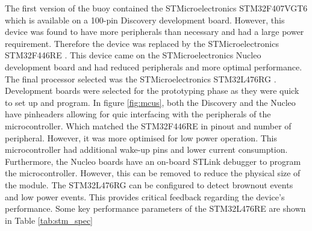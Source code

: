 The first version of the buoy contained the STMicroelectronics STM32F407VGT6 \cite{stmdisc} which is available on a 100-pin Discovery development board. However, this device was found to have more peripherals than necessary and had a large power requirement. Therefore the device was replaced by the STMicroelectronics STM32F446RE \cite{stmnucleo}. This device came on the STMicroelectronics Nucleo development board and had reduced peripherals and more optimal performance. The final processor selected was the STMicroelectronics STM32L476RG \cite{stm32l4}. Development boards were selected for the prototyping phase as they were quick to set up and program. In figure \ref{fig:mcus}, both the Discovery and the Nucleo have pinheaders allowing for quic interfacing with the peripherals of the microcontroller. Which matched the STM32F446RE in pinout and number of peripheral. However, it was more optimised for low power operation. This microcontroller had additional wake-up pins and lower current consumption. Furthermore, the Nucleo boards have an on-board STLink debugger to program the microcontroller. However, this can be removed to reduce the physical size of the module. The STM32L476RG can be configured to detect brownout events and low power events. This provides critical feedback regarding the device's performance. Some key performance parameters of the STM32L476RE are shown in Table \ref{tab:stm_spec}

